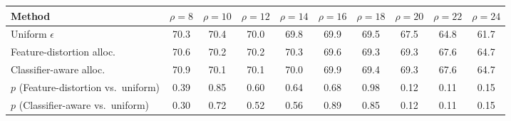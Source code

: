 \begin{tabular}{lccccccccc}
\toprule
Method & $\rho=8$ & $\rho=10$ & $\rho=12$ & $\rho=14$ & $\rho=16$ & $\rho=18$ & $\rho=20$ & $\rho=22$ & $\rho=24$ \\
\midrule
Uniform $\epsilon$ & 70.3 & 70.4 & 70.0 & 69.8 & 69.9 & 69.5 & 67.5 & 64.8 & 61.7 \\
Feature-distortion alloc. & 70.6 & 70.2 & 70.2 & 70.3 & 69.6 & 69.3 & 69.3 & 67.6 & 64.7 \\
Classifier-aware alloc. & 70.9 & 70.1 & 70.1 & 70.0 & 69.9 & 69.4 & 69.3 & 67.6 & 64.7 \\
\quad $p$ (Feature-distortion vs.\ uniform) & 0.39 & 0.85 & 0.60 & 0.64 & 0.68 & 0.98 & 0.12 & 0.11 & 0.15 \\
\quad $p$ (Classifier-aware vs.\ uniform) & 0.30 & 0.72 & 0.52 & 0.56 & 0.89 & 0.85 & 0.12 & 0.11 & 0.15 \\
\bottomrule
\end{tabular}
